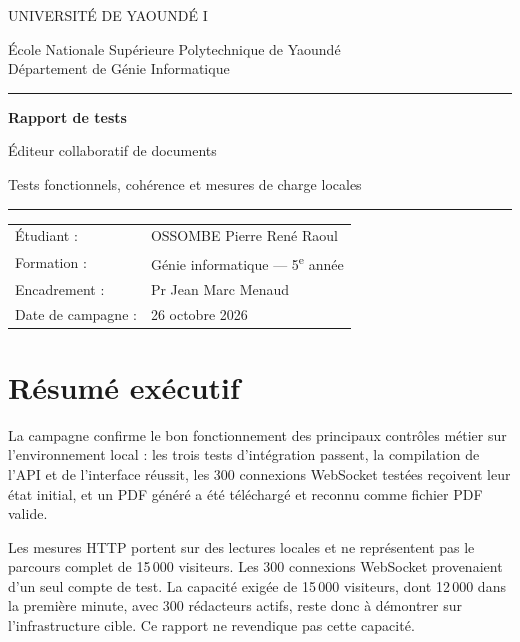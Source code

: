 \documentclass[11pt,a4paper,oneside]{report}
\begin{document}
\begin{titlepage}
\pagecolor{bleunuit}\color{white}
\thispagestyle{empty}
\vspace*{1.2cm}
{\Large UNIVERSITÉ DE YAOUNDÉ I\par}
\vspace{.2cm}
{\large École Nationale Supérieure Polytechnique de Yaoundé\\Département de Génie Informatique\par}
\vfill
\color{white}\rule{\textwidth}{1.2pt}\par
\vspace{1.0cm}
{\Huge\bfseries Rapport de tests\par}
\vspace{.5cm}
{\LARGE Éditeur collaboratif de documents\par}
\vspace{.4cm}
{\large Tests fonctionnels, cohérence et mesures de charge locales\par}
\vspace{1.0cm}
\color{white}\rule{\textwidth}{1.2pt}\par
\vfill
\begin{tabular}{@{}ll@{}}
Étudiant : & OSSOMBE Pierre René Raoul\\
Formation : & Génie informatique — 5\textsuperscript{e} année\\
Encadrement : & Pr Jean Marc Menaud\\
Date de campagne : & 26 octobre 2026
\end{tabular}
\vspace{1.2cm}
\end{titlepage}
\nopagecolor\color{black}
\hypersetup{pageanchor=true}
\chapter*{Résumé exécutif}
La campagne confirme le bon fonctionnement des principaux contrôles métier sur l’environnement local : les trois tests d’intégration passent, la compilation de l’API et de l’interface réussit, les 300 connexions WebSocket testées reçoivent leur état initial, et un PDF généré a été téléchargé et reconnu comme fichier PDF valide.

Les mesures HTTP portent sur des lectures locales et ne représentent pas le parcours complet de 15\,000 visiteurs. Les 300 connexions WebSocket provenaient d’un seul compte de test. La capacité exigée de 15\,000 visiteurs, dont 12\,000 dans la première minute, avec 300 rédacteurs actifs, reste donc à démontrer sur l’infrastructure cible. Ce rapport ne revendique pas cette capacité.
\end{document}
